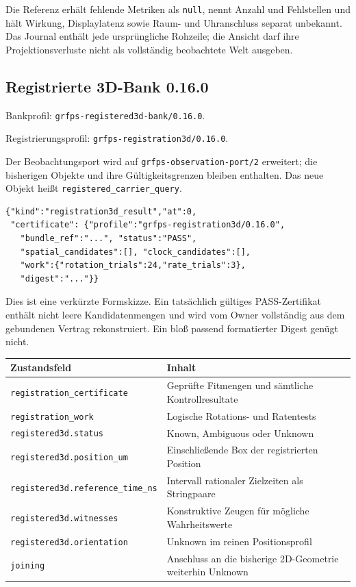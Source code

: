 \documentclass[11pt,a4paper]{article}
\begin{document}
Die Referenz erhält fehlende Metriken als \texttt{null}, nennt
Anzahl und Fehlstellen und hält Wirkung, Displaylatenz sowie
Raum- und Uhranschluss separat unbekannt. Das Journal enthält
jede ursprüngliche Rohzeile; die Ansicht darf ihre Projektionsverluste
nicht als vollständig beobachtete Welt ausgeben.

\clearpage\subsection{Registrierte 3D-Bank 0.16.0}
Bankprofil: \texttt{grfps-registered3d-bank/0.16.0}.\par
Registrierungsprofil: \texttt{grfps-registration3d/0.16.0}.\par
Der Beobachtungsport wird auf \texttt{grfps-observation-port/2}
erweitert; die bisherigen Objekte und ihre Gültigkeitsgrenzen bleiben
enthalten. Das neue Objekt heißt \texttt{registered\_carrier\_query}.

\begin{lstlisting}
{"kind":"registration3d_result","at":0,
 "certificate": {"profile":"grfps-registration3d/0.16.0",
   "bundle_ref":"...", "status":"PASS",
   "spatial_candidates":[], "clock_candidates":[],
   "work":{"rotation_trials":24,"rate_trials":3},
   "digest":"..."}}
\end{lstlisting}
Dies ist eine verkürzte Formskizze. Ein tatsächlich gültiges
PASS-Zertifikat enthält nicht leere Kandidatenmengen und wird
vom Owner vollständig aus dem gebundenen Vertrag rekonstruiert.
Ein bloß passend formatierter Digest genügt nicht.

\begin{tabularx}{\linewidth}{@{}lY@{}}\toprule
Zustandsfeld & Inhalt\\\midrule
\texttt{registration\_certificate} & Geprüfte Fitmengen und sämtliche Kontrollresultate\\
\texttt{registration\_work} & Logische Rotations- und Ratentests\\
\texttt{registered3d.status} & Known, Ambiguous oder Unknown\\
\texttt{registered3d.position\_um} & Einschließende Box der registrierten Position\\
\texttt{registered3d.reference\_time\_ns} & Intervall rationaler Zielzeiten als Stringpaare\\
\texttt{registered3d.witnesses} & Konstruktive Zeugen für mögliche Wahrheitswerte\\
\texttt{registered3d.orientation} & Unknown im reinen Positionsprofil\\
\texttt{joining} & Anschluss an die bisherige 2D-Geometrie weiterhin Unknown\\\bottomrule
\end{tabularx}
\end{document}
